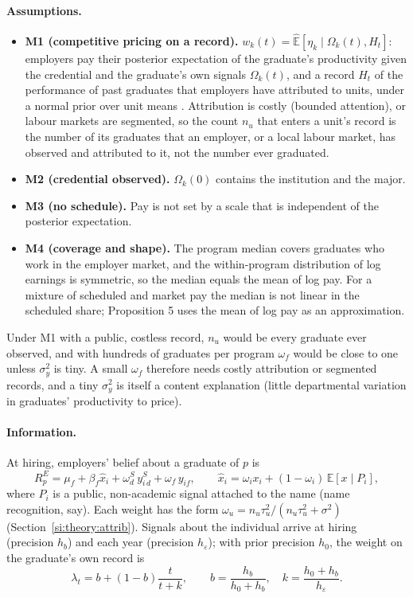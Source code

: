 \paragraph{Assumptions.}
\begin{itemize}
\item \textbf{M1 (competitive pricing on a record).} $w_k(t)=\hat{\mathbb E}[\eta_k\mid\Omega_k(t),H_t]$:
employers pay their posterior expectation of the graduate's productivity given the credential and the graduate's
own signals $\Omega_k(t)$, and a record $H_t$ of the performance of past graduates that employers have attributed
to units, under a normal prior over unit means \citep{farber1996learning}. Attribution is costly (bounded
attention), or labour markets are segmented, so the count $n_u$ that enters a unit's record is the number of its
graduates that an employer, or a local labour market, has observed and attributed to it, not the number ever
graduated.
\item \textbf{M2 (credential observed).} $\Omega_k(0)$ contains the institution and the major.
\item \textbf{M3 (no schedule).} Pay is not set by a scale that is independent of the posterior expectation.
\item \textbf{M4 (coverage and shape).} The program median covers graduates who work in the employer market, and
the within-program distribution of log earnings is symmetric, so the median equals the mean of log pay. For a
mixture of scheduled and market pay the median is not linear in the scheduled share; Proposition 5 uses the
mean of log pay as an approximation.
\end{itemize}
Under M1 with a public, costless record, $n_u$ would be every graduate ever observed, and with hundreds of
graduates per program $\omega_f$ would be close to one unless $\sigma_y^2$ is tiny. A small $\omega_f$ therefore
needs costly attribution or segmented records, and a tiny $\sigma_y^2$ is itself a content explanation (little
departmental variation in graduates' productivity to price).

\paragraph{Information.} At hiring, employers' belief about a graduate of $p$ is
\[
R^E_p=\mu_f+\beta_f\hat x_i+\omega^S_d\,y^S_{i\,d}+\omega_f\,y_{if},\qquad \hat x_i=\omega_ix_i+(1-\omega_i)\,\mathbb E[x\mid P_i],
\]
where $P_i$ is a public, non-academic signal attached to the name (name recognition, say). Each weight has the form
$\omega_u=n_u\tau_u^2/(n_u\tau_u^2+\sigma^2)$ (Section~\ref{si:theory:attrib}). Signals about the individual
arrive at hiring (precision $h_b$) and each year (precision $h_\varepsilon$); with prior precision $h_0$, the
weight on the graduate's own record is
\[
\lambda_t=b+(1-b)\frac{t}{t+k},\qquad b=\frac{h_b}{h_0+h_b},\quad k=\frac{h_0+h_b}{h_\varepsilon} .
\]

